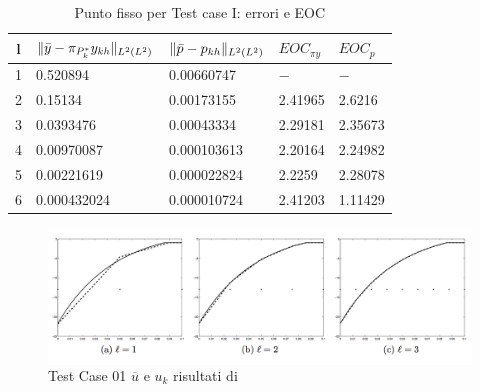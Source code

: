 \begin{table}
\caption{Punto fisso per Test case I: errori e EOC }
\label{puntofissoIbis}
\centering

\begin{tabular}{cllll}
\toprule
{l}           &  {$ \lVert\bar{y}-\pi_{P^*_k}y_{kh}\rVert_{L^2(L^2)} $} &  {$ \lVert\bar{p}-p_{kh}\rVert_{L^2(L^2)} $} &  {$ EOC_{\pi y} $} &  {$ EOC_p $} \\
\midrule
1            &  0.520894 &  0.00660747 &  {$-$} &  {$-$} \\
2            &  0.15134 &  0.00173155 &  2.41965 &  2.6216 \\
3            &  0.0393476 &  0.00043334 &  2.29181 &  2.35673 \\
4            &  0.00970087 &  0.000103613 &  2.20164 &  2.24982 \\
5            &  0.00221619 &  0.000022824 &  2.2259 &  2.28078 \\
6            &  0.000432024 &  0.000010724 &  2.41203 &  1.11429 \\
\bottomrule
\end{tabular}              

\end{table}
\begin{figure}
\centering
\includegraphics[width=\linewidth]{img/cap6/TestCase01_ues_paper}
\caption{Test Case 01 $\overline{u}$ e $u_k$ risultati di \cite{MAIN}}
\label{fig:500}
\end{figure}

